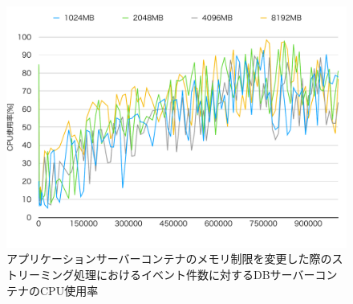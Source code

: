 \documentclass[../../../../../main]{subfiles}
\begin{document}
    \begin{figure}[H]
        \centering
        \includegraphics[width=12cm]{graph}
        \caption{アプリケーションサーバーコンテナのメモリ制限を変更した際のストリーミング処理におけるイベント件数に対するDBサーバーコンテナのCPU使用率}
        \label{fig:stream-change-app-memory-limit-db-cpu-app_4_db_1_1024}
    \end{figure}
\end{document}
